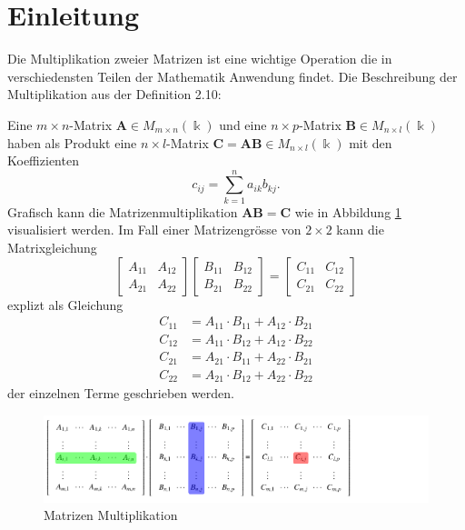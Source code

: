 %
%
%
\section{Einleitung \label{multiplikation:section:einleitung}}

Die Multiplikation zweier Matrizen ist eine wichtige Operation die in verschiedensten Teilen der Mathematik Anwendung findet.
Die Beschreibung der Multiplikation aus der Definition 2.10:

Eine $m\times n$-Matrix $\mathbf{A}\in M_{m\times n}(\Bbbk)$ und eine
$n\times p$-Matrix $\mathbf{B}\in M_{n\times l}(\Bbbk)$ haben als Produkt
eine $n\times l$-Matrix $\mathbf{C}=\mathbf{AB}\in M_{n\times l}(\Bbbk)$ mit den
Koeffizienten
\begin{equation}
c_{ij} = \sum_{k=1}^n a_{ik} b_{kj}.
\label{multiplikation:eq:MM}
\end{equation}
Grafisch kann die Matrizenmultiplikation $\mathbf{AB}=\mathbf{C}$ wie in Abbildung \ref{multiplikation:fig:mm_viz} visualisiert werden.
Im Fall einer Matrizengr\"osse von $2\times 2$ kann die Matrixgleichung
\begin{equation}
  \begin{bmatrix}
A_{11} & A_{12}\\
A_{21} & A_{22}
\end{bmatrix}
\begin{bmatrix}
B_{11} & B_{12}\\
B_{21} & B_{22}
\end{bmatrix}
=
\begin{bmatrix}
C_{11} & C_{12}\\
C_{21} & C_{22}
\end{bmatrix}
\end{equation}
explizt als Gleichung
\begin{equation} \label{multiplikation:eq:MM_exp}
\begin{split}
C_{11} &= A_{11} \cdot B_{11} + A_{12} \cdot B_{21}\\
C_{12} &= A_{11} \cdot B_{12} + A_{12} \cdot B_{22}\\
C_{21} &= A_{21} \cdot B_{11} + A_{22} \cdot B_{21}\\
C_{22} &= A_{21} \cdot B_{12} + A_{22} \cdot B_{22}
\end{split}
\end{equation}
der einzelnen Terme geschrieben werden.
\begin{figure}
	\center
	\includegraphics[]{papers/multiplikation/images/mm_visualisation}
	\caption{Matrizen Multiplikation}
	\label{multiplikation:fig:mm_viz}
\end{figure}
